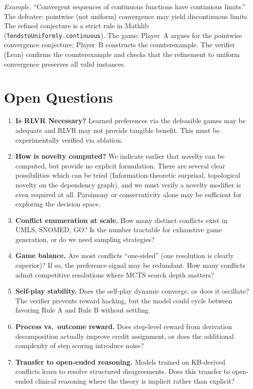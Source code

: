 \documentclass{article}
\begin{document}
\textit{Example.} ``Convergent sequences of continuous functions have continuous limits.'' The defeater: pointwise (not uniform) convergence may yield discontinuous limits. The refined conjecture is a strict rule in Mathlib (\texttt{TendstoUniformly.continuous}). The game: Player~A argues for the pointwise convergence conjecture; Player~B constructs the counterexample. The verifier (Lean) confirms the counterexample and checks that the refinement to uniform convergence preserves all valid instances.

\section{Open Questions}

\begin{enumerate}
    \item \textbf{Is RLVR Necessary?} Learned preferences via the defeasible games may be adequate and RLVR may not provide tangible benefit. This must be experimentally verified via ablation.
    \item \textbf{How is novelty computed?} We indicate earlier that novelty can be computed, but provide no explicit formulation. There are several clear possibilities which can be tried (Information-theoretic surprisal, topological novelty on the dependency graph), and we must verify a novelty modifier is even required at all. Parsimony or conservativity alone may be sufficient for exploring the decision space.
    \item \textbf{Conflict enumeration at scale.} How many distinct conflicts exist in UMLS, SNOMED, GO? Is the number tractable for exhaustive game generation, or do we need sampling strategies?
    \item \textbf{Game balance.} Are most conflicts ``one-sided'' (one resolution is clearly superior)? If so, the preference signal may be redundant. How many conflicts admit competitive resolutions where MCTS search depth matters?
    \item \textbf{Self-play stability.} Does the self-play dynamic converge, or does it oscillate? The verifier prevents reward hacking, but the model could cycle between favoring Rule A and Rule B without settling.
    \item \textbf{Process vs.\ outcome reward.} Does step-level reward from derivation decomposition actually improve credit assignment, or does the additional complexity of step scoring introduce noise?
    \item \textbf{Transfer to open-ended reasoning.} Models trained on KB-derived conflicts learn to resolve structured disagreements. Does this transfer to open-ended clinical reasoning where the theory is implicit rather than explicit?

\end{enumerate}
\end{document}
